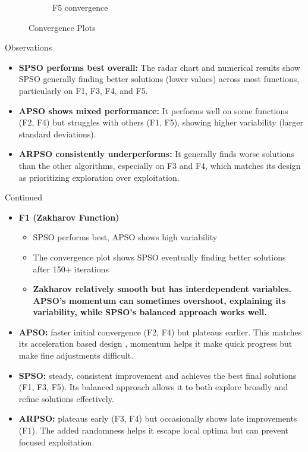 \documentclass[aspectratio=169]{beamer}
\begin{document}
\begin{frame}
\begin{figure}
\begin{subfigure}[b]{0.19\textwidth}
            \caption*{F5 convergence}
        \end{subfigure}
        \vspace{-1ex}
        \caption*{\scriptsize Convergence Plots}
    \end{figure}
\end{frame}

\begin{frame}{Observations}
    \begin{itemize}
        \item \textbf{SPSO performs best overall:} The radar chart and numerical results show SPSO generally finding better solutions (lower values) across most functions, particularly on F1, F3, F4, and F5.
        \item \textbf{APSO shows mixed performance:} It performs well on some functions (F2, F4) but struggles with others (F1, F5), showing higher variability (larger standard deviations).
        \item \textbf{ARPSO consistently underperforms:} It generally finds worse solutions than the other algorithms, especially on F3 and F4, which matches its design as prioritizing exploration over exploitation.
    \end{itemize}
\end{frame}
\begin{frame}{Continued}
    \begin{itemize}
        \item \textbf{F1 (Zakharov Function)}
        \begin{itemize}
            \item SPSO performs best, APSO shows high variability
            \item The convergence plot shows SPSO eventually finding better solutions after 150+ iterations
            \item \textbf{Zakharov relatively smooth but has interdependent variables. APSO's momentum can sometimes overshoot, explaining its variability, while SPSO's balanced approach works well.}
        \end{itemize}
        \item \textbf{APSO:} faster initial convergence (F2, F4) but plateaus earlier. This matches its acceleration based design , momentum helps it make quick progress but make fine adjustments difficult.
        \item \textbf{SPSO:} steady, consistent improvement and achieves the best final solutions (F1, F3, F5). Its balanced approach allows it to both explore broadly and refine solutions effectively.
        \item \textbf{ARPSO:} plateaus early (F3, F4) but occasionally shows late improvements (F1). The added randomness helps it escape local optima but can prevent focused exploitation.
    \end{itemize}
\end{frame}
\end{document}
